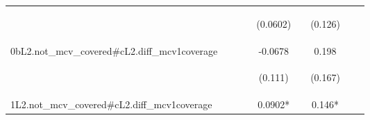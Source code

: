 \documentclass[]{article}
\begin{document}
\begin{center}
\begin{tabular}{lcccccccc}
\vspace{4pt} & \begin{footnotesize}\end{footnotesize} & \begin{footnotesize}\end{footnotesize} & \begin{footnotesize}\end{footnotesize} & \begin{footnotesize}(0.0602)\end{footnotesize} & \begin{footnotesize}\end{footnotesize} & \begin{footnotesize}(0.126)\end{footnotesize} & \begin{footnotesize}\end{footnotesize} & \begin{footnotesize}\end{footnotesize} \\
0bL2.not\_mcv\_covered\#cL2.diff\_mcv1coverage &  &  &  & -0.0678 &  & 0.198 &  &  \\
\vspace{4pt} & \begin{footnotesize}\end{footnotesize} & \begin{footnotesize}\end{footnotesize} & \begin{footnotesize}\end{footnotesize} & \begin{footnotesize}(0.111)\end{footnotesize} & \begin{footnotesize}\end{footnotesize} & \begin{footnotesize}(0.167)\end{footnotesize} & \begin{footnotesize}\end{footnotesize} & \begin{footnotesize}\end{footnotesize} \\
1L2.not\_mcv\_covered\#cL2.diff\_mcv1coverage &  &  &  & 0.0902* &  & 0.146* &  &  \\

\end{tabular}
\end{center}
\end{document}
